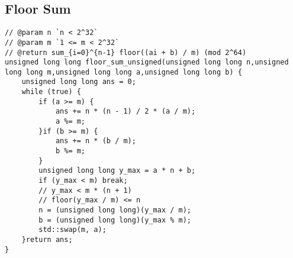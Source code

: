 \documentclass[landscape, 8pt, a4paper, oneside, twocolumn]{extarticle}
\begin{document}
\subsection{Floor Sum}
\begin{verbatim}
// @param n `n < 2^32`
// @param m `1 <= m < 2^32`
// @return sum_{i=0}^{n-1} floor((ai + b) / m) (mod 2^64)
unsigned long long floor_sum_unsigned(unsigned long long n,unsigned long long m,unsigned long long a,unsigned long long b) {
    unsigned long long ans = 0;
    while (true) {
        if (a >= m) {
            ans += n * (n - 1) / 2 * (a / m);
            a %= m;
        }if (b >= m) {
            ans += n * (b / m);
            b %= m;
        }
        unsigned long long y_max = a * n + b;
        if (y_max < m) break;
        // y_max < m * (n + 1)
        // floor(y_max / m) <= n
        n = (unsigned long long)(y_max / m);
        b = (unsigned long long)(y_max % m);
        std::swap(m, a);
    }return ans;
}
\end{verbatim}
\end{document}
